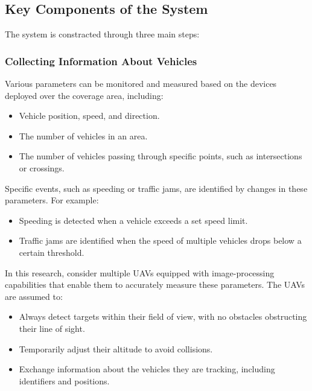 \vspace{\baselineskip} %

\subsection{Key Components of the System}
The system is constracted through three main steps:

\subsubsection{Collecting Information About Vehicles}
Various parameters can be monitored and measured based on the devices deployed over the coverage area, including:
\begin{itemize}
    \item Vehicle position, speed, and direction.
    \item The number of vehicles in an area.
    \item The number of vehicles passing through specific points, such as intersections or crossings.
\end{itemize}

Specific events, such as speeding or traffic jams, are identified by changes in these parameters. For example:
\begin{itemize}
    \item Speeding is detected when a vehicle exceeds a set speed limit.
    \item Traffic jams are identified when the speed of multiple vehicles drops below a certain threshold.
\end{itemize}

In this research, \cite{elloumi2018monitoring} consider multiple UAVs equipped with image-processing capabilities that enable them to accurately measure these parameters. The UAVs are assumed to:
\begin{itemize}
    \item Always detect targets within their field of view, with no obstacles obstructing their line of sight.
    \item Temporarily adjust their altitude to avoid collisions.
    \item Exchange information about the vehicles they are tracking, including identifiers and positions.
\end{itemize}

\vspace{\baselineskip} %

